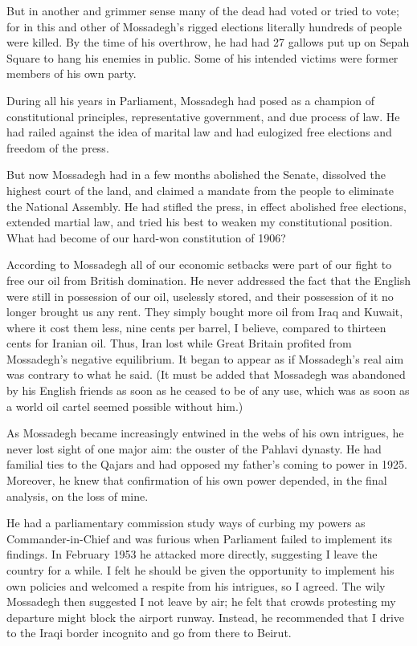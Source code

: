 But in another and grimmer sense many of the dead had voted or tried to vote; for in this and other of Mossadegh’s rigged elections literally hundreds of people were killed. By the time of his overthrow, he had had 27 gallows put up on Sepah Square to hang his enemies in public. Some of his intended victims were former members of his own party. 

During all his years in Parliament, Mossadegh had posed as a champion of constitutional principles, representative government, and due process of law. He had railed against the idea of marital law and had eulogized free elections and freedom of the press. 

But now Mossadegh had in a few months abolished the Senate, dissolved the highest court of the land, and claimed a mandate from the people to eliminate the National Assembly. He had stifled the press, in effect abolished free elections, extended martial law, and tried his best to weaken my constitutional position. What had become of our hard-won constitution of 1906? 



According to Mossadegh all of our economic setbacks were part of our fight to free our oil from British domination. He never addressed the fact that the English were still in possession of our oil, uselessly stored, and their possession of it no longer brought us any rent. They simply bought more oil from Iraq and Kuwait, where it cost them less, nine cents per barrel, I believe, compared to thirteen cents for Iranian oil. Thus, Iran lost while Great Britain profited from Mossadegh’s negative equilibrium. It began to appear as if Mossadegh’s real aim was contrary to what he said. (It must be added that Mossadegh was abandoned by his English friends as soon as he ceased to be of any use, which was as soon as a world oil cartel seemed possible without him.) 

As Mossadegh became increasingly entwined in the webs of his own intrigues, he never lost sight of one major aim: the ouster of the Pahlavi dynasty. He had familial ties to the Qajars and had opposed my father's coming to power in 1925. Moreover, he knew that confirmation of his own power depended, in the final analysis, on the loss of mine. 

He had a parliamentary commission study ways of curbing my powers as Commander-in-Chief and was furious when Parliament failed to implement its findings. In February 1953 he attacked more directly, suggesting I leave the country for a while. I felt he should be given the opportunity to implement his own policies and welcomed a respite from his intrigues, so I agreed. The wily Mossadegh then suggested I not leave by air; he felt that crowds protesting my departure might block the airport runway. Instead, he recommended that I drive to the Iraqi border incognito and go from there to Beirut. 

